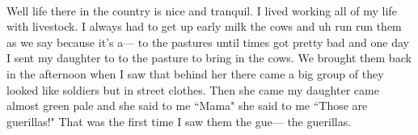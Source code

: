 \begin{exe}
  \ex\label{ex:3.7}
  \\
  \onehalfspacing
  Well life there in the country is nice and tranquil. I lived working all of my life with livestock. I always had to get up early milk the cows and uh run run them as we say because it's a— to the pastures until times got pretty bad and one day I sent my daughter to to the pasture to bring in the cows. We brought them back in the afternoon when I saw that behind her there came a big group of they looked like soldiers but in street clothes. Then she came my daughter came almost green pale and she said to me ``Mama" she said to me ``Those are guerillas!" That was the first time I saw them the gue— the guerillas.
\end{exe}

